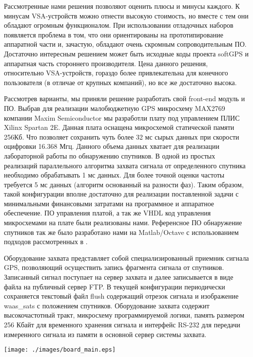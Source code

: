 \documentclass[a4paper,12pt]{article}
\numberwithin{equation}{section}		%
\numberwithin{table}{section}
\begin{document}
Рассмотренные нами решения позволяют оценить плюсы и минусы каждого.
К минусам VSA-устройств можно отнести высокую стоимость, но вместе с тем они обладают огромным функционалом.
При использовании отладочных наборов появляется проблема в том, что они ориентированы на прототипирование аппаратной
части и, зачастую, обладают очень скромным сопроводительным ПО.
Достаточно интересным решением может быть исходные коды проекта softGPS и аппаратная часть стороннего производителя.
Цена данного решения, относительно VSA-устройств, гораздо более привлекательна для конечного пользователя
(в отличае от крупных компаний), но все же достаточно высока.

Рассмотрев варианты, мы приняли решение разработать свой front-end модуль и ПО.
Выбрав для реализации малобюджетную GPS микросхему MAX2769 компании Maxim Semiconductor мы разработли плату под управлением ПЛИС Xilinx Spartan 2E.
Данная плата оснащена микросхемой статической памяти 256Кб.
Что позволяет сохранить чуть более 32 мс сырых данных при скорости оцифровки 16.368 Мгц.
Данного объема данных хватает для реализации лабораторной работы по обнаружению спутников.
В одной из простых реализаций параллельного алгоритма захвата сигнала от определенного спутника необходимо обрабатывать 1 мс данных.
Для более точной оценки частоты требуется 5 мс данных (алгоритм основанный на разности фаз).
Таким образом, такой конфигурации вполне достаточно для реализации поставленной задачи с минимальными
финансовыми затратами на программное и аппаратное обеспечение.
ПО управления платой, а так же VHDL код управления микросхемами на плате были реализованы нами.
Референсное ПО обнаружение спутников так же было разработано нами на Matlab/Octave с использованием подходов рассмотренных в \cite{tsui}.

Оборудование захвата представляет собой специализированный приемник сигнала GPS, позволяющий осуществить запись фрагмента сигнала от спутников.
Записанный сигнал поступает на сервер захвата и далее записывается в виде файла на публичный сервер FTP.
В текущей конфигурации \cite{gpsproject} периодически сохраняется текстовый файл flush содержащий отрезок сигнала и изображение waas\_sats с
положением спутников. Оборудование захвата содержит высокочастотный тракт, микросхему программируемой логики, память размером 256 Кбайт
для временного хранения сигнала и интерфейс RS-232 для передачи измеренного сигнала из памяти в основной сервер системы захвата.

\texttt{[image: ./images/board\_main.eps]}
\end{document}
